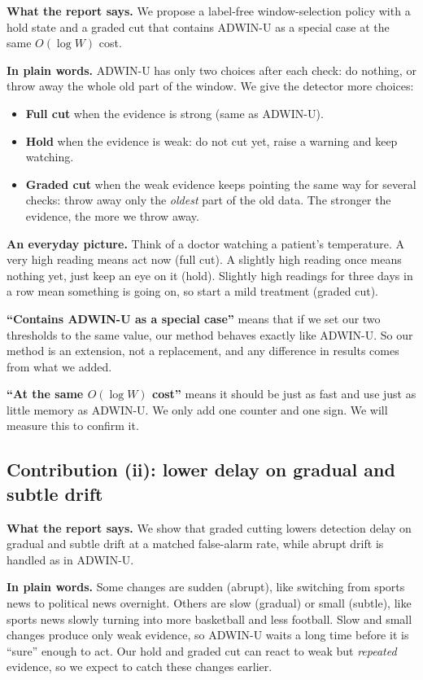 \documentclass[11pt,a4paper]{article}
\begin{document}
\textbf{What the report says.} We propose a label-free window-selection policy with a hold state and a graded cut that contains ADWIN-U as a special case at the same $O(\log W)$ cost.

\textbf{In plain words.} ADWIN-U has only two choices after each check: do nothing, or throw away the whole old part of the window. We give the detector more choices:
\begin{itemize}
\item \textbf{Full cut} when the evidence is strong (same as ADWIN-U).
\item \textbf{Hold} when the evidence is weak: do not cut yet, raise a warning and keep watching.
\item \textbf{Graded cut} when the weak evidence keeps pointing the same way for several checks: throw away only the \emph{oldest} part of the old data. The stronger the evidence, the more we throw away.
\end{itemize}

\textbf{An everyday picture.} Think of a doctor watching a patient's temperature. A very high reading means act now (full cut). A slightly high reading once means nothing yet, just keep an eye on it (hold). Slightly high readings for three days in a row mean something is going on, so start a mild treatment (graded cut).

\textbf{``Contains ADWIN-U as a special case''} means that if we set our two thresholds to the same value, our method behaves exactly like ADWIN-U. So our method is an extension, not a replacement, and any difference in results comes from what we added.

\textbf{``At the same $O(\log W)$ cost''} means it should be just as fast and use just as little memory as ADWIN-U. We only add one counter and one sign. We will measure this to confirm it.

\subsection*{Contribution (ii): lower delay on gradual and subtle drift}

\textbf{What the report says.} We show that graded cutting lowers detection delay on gradual and subtle drift at a matched false-alarm rate, while abrupt drift is handled as in ADWIN-U.

\textbf{In plain words.} Some changes are sudden (abrupt), like switching from sports news to political news overnight. Others are slow (gradual) or small (subtle), like sports news slowly turning into more basketball and less football. Slow and small changes produce only weak evidence, so ADWIN-U waits a long time before it is ``sure'' enough to act. Our hold and graded cut can react to weak but \emph{repeated} evidence, so we expect to catch these changes earlier.
\end{document}
